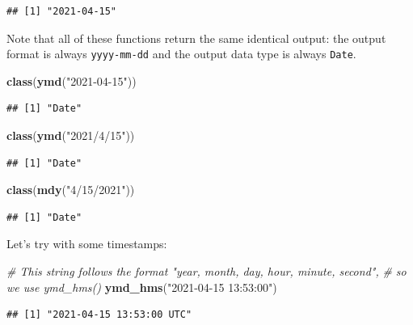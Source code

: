 \documentclass[
]{book}
\newenvironment{Shaded}{\begin{snugshade}}{\end{snugshade}}
\newcommand{\CommentTok}[1]{\textcolor[rgb]{0.56,0.35,0.01}{\textit{#1}}}
\newcommand{\FunctionTok}[1]{\textcolor[rgb]{0.13,0.29,0.53}{\textbf{#1}}}
\newcommand{\NormalTok}[1]{#1}
\newcommand{\StringTok}[1]{\textcolor[rgb]{0.31,0.60,0.02}{#1}}
\begin{document}
\begin{verbatim}
## [1] "2021-04-15"
\end{verbatim}

Note that all of these functions return the same identical output: the output format is always \texttt{yyyy-mm-dd} and the output data type is always \texttt{Date}.

\begin{Shaded}
\begin{Highlighting}[]
\FunctionTok{class}\NormalTok{(}\FunctionTok{ymd}\NormalTok{(}\StringTok{"2021{-}04{-}15"}\NormalTok{))}
\end{Highlighting}
\end{Shaded}

\begin{verbatim}
## [1] "Date"
\end{verbatim}

\begin{Shaded}
\begin{Highlighting}[]
\FunctionTok{class}\NormalTok{(}\FunctionTok{ymd}\NormalTok{(}\StringTok{"2021/4/15"}\NormalTok{))}
\end{Highlighting}
\end{Shaded}

\begin{verbatim}
## [1] "Date"
\end{verbatim}

\begin{Shaded}
\begin{Highlighting}[]
\FunctionTok{class}\NormalTok{(}\FunctionTok{mdy}\NormalTok{(}\StringTok{"4/15/2021"}\NormalTok{))}
\end{Highlighting}
\end{Shaded}

\begin{verbatim}
## [1] "Date"
\end{verbatim}

Let's try with some timestamps:

\begin{Shaded}
\begin{Highlighting}[]
\CommentTok{\# This string follows the format "year, month, day, hour, minute, second", }
\CommentTok{\# so we use ymd\_hms()}
\FunctionTok{ymd\_hms}\NormalTok{(}\StringTok{"2021{-}04{-}15 13:53:00"}\NormalTok{)}
\end{Highlighting}
\end{Shaded}

\begin{verbatim}
## [1] "2021-04-15 13:53:00 UTC"
\end{verbatim}
\end{document}
